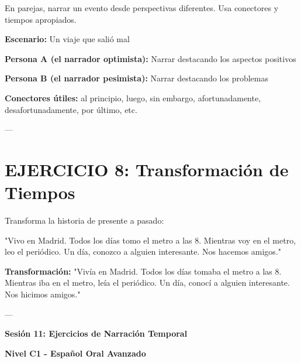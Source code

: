 \documentclass[a4paper,11pt]{article}
\begin{document}
\vspace{0.2cm}

En parejas, narrar un evento desde perspectivas diferentes. Usa conectores y tiempos apropiados.

\vspace{0.2cm}

\textbf{Escenario:} Un viaje que salió mal

\vspace{0.2cm}

\textbf{Persona A (el narrador optimista):} Narrar destacando los aspectos positivos

\vspace{0.2cm}

\textbf{Persona B (el narrador pesimista):} Narrar destacando los problemas

\vspace{0.2cm}

\textbf{Conectores útiles:} al principio, luego, sin embargo, afortunadamente, desafortunadamente, por último, etc.

\vspace{0.2cm}

---

\vspace{0.2cm}

\section{EJERCICIO 8: Transformación de Tiempos}

\vspace{0.2cm}

Transforma la historia de presente a pasado:

\vspace{0.2cm}

"Vivo en Madrid. Todos los días tomo el metro a las 8. Mientras voy en el metro, leo el periódico. Un día, conozco a alguien interesante. Nos hacemos amigos."

\vspace{0.2cm}

\textbf{Transformación:} "Vivía en Madrid. Todos los días tomaba el metro a las 8. Mientras iba en el metro, leía el periódico. Un día, conocí a alguien interesante. Nos hicimos amigos."

\vspace{0.2cm}

---

\vspace{0.2cm}

\textbf{Sesión 11: Ejercicios de Narración Temporal}

\textbf{Nivel C1 - Español Oral Avanzado}

\vspace{0.2cm}
\end{document}
